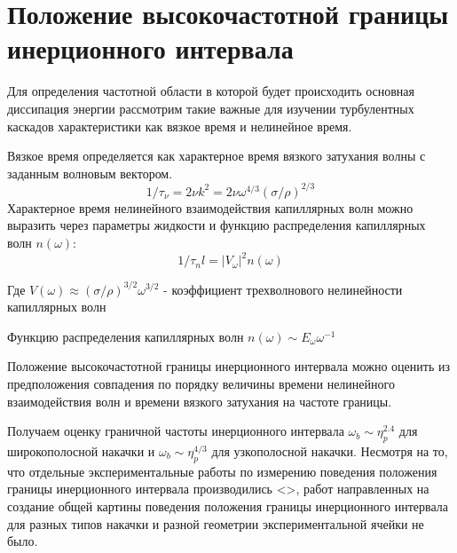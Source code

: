 \section{Положение высокочастотной границы инерционного интервала}%

Для определения частотной области в которой будет происходить основная диссипация энергии рассмотрим такие важные для изучении турбулентных каскадов характеристики как вязкое время и нелинейное время.

Вязкое время определяется как характерное время вязкого затухания волны с заданным волновым вектором.
\begin{equation}
1/\tau_\nu = 2\nu k^2 = 2 \nu \omega^{4/3}(\sigma/\rho)^{2/3}
\end{equation}
Характерное время нелинейного взаимодействия капиллярных волн можно выразить через параметры жидкости и функцию распределения капиллярных волн $n(\omega)$:
\begin{equation}
1/\tau_nl = |V_\omega|^2 n(\omega)
\end{equation}

Где $V(\omega) \approx (\sigma/\rho)^{3/2}\omega^{3/2}$ - коэффициент трехволнового нелинейности капиллярных волн

Функцию распределения капиллярных волн $n(\omega) \sim E_{\omega}\omega^{-1}$ 

Положение высокочастотной границы инерционного интервала можно оценить из предположения совпадения по порядку величины времени нелинейного взаимодействия волн и времени вязкого затухания на частоте границы.

Получаем оценку граничной частоты инерционного интервала $\omega_b \sim \eta_p^{2.4}$ для широкополосной накачки и $\omega_b \sim \eta_p^{4/3}$ для узкополосной накачки. Несмотря на то, что отдельные экспериментальные работы по измерению поведения положения границы инерционного интервала производились <>, работ направленных на создание общей картины поведения положения границы инерционного интервала для разных типов накачки и разной геометрии экспериментальной ячейки не было.



